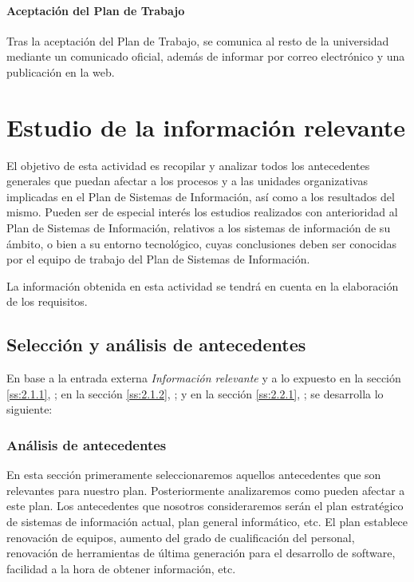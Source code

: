 \documentclass[11pt,a4paper,spanish,twoside]{book}
\begin{document}
\subsubsection{Aceptación del Plan de Trabajo}
Tras la aceptación del Plan de Trabajo, se comunica al resto de la
universidad mediante un comunicado oficial, además de informar por correo
electrónico y una publicación en la web.


\chapter{Estudio de la información relevante}
El objetivo de esta actividad es recopilar y analizar todos los antecedentes
generales que puedan afectar a los procesos y a las unidades organizativas
implicadas en el Plan de Sistemas de Información, así como a los resultados
del mismo. Pueden ser de especial interés los estudios realizados con
anterioridad al Plan de Sistemas de Información, relativos a los sistemas de
información de su ámbito, o bien a su entorno tecnológico, cuyas conclusiones
deben ser conocidas por el equipo de trabajo del Plan de Sistemas de
Información. 

La información obtenida en esta actividad se tendrá en cuenta en
la elaboración de los requisitos.

\section{Selección y análisis de antecedentes}
En base a la entrada externa \emph{Información relevante} y a lo expuesto 
en la sección \vref{ss:2.1.1}, \emph{}; 
en la sección \vref{ss:2.1.2}, \emph{}; y
en la sección \vref{ss:2.2.1}, \emph{}; 
se desarrolla lo siguiente:

\subsection{Análisis de antecedentes} \label{ss:3.1.1}
En esta sección primeramente seleccionaremos aquellos antecedentes que son
relevantes para nuestro plan. Posteriormente analizaremos como pueden
afectar a este plan. Los antecedentes que nosotros consideraremos serán el
plan estratégico de sistemas de información actual, plan general
informático, etc. 
El plan establece renovación de equipos, aumento del grado de cualificación
del personal, renovación de herramientas de última generación para el
desarrollo de software, facilidad a la hora de obtener información, etc. 
\end{document}
